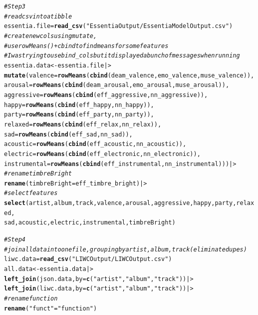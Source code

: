 \documentclass{article}\usepackage[]{graphicx}\usepackage[]{xcolor}
\makeatletter
\newcommand{\hlsng}[1]{\textcolor[rgb]{0.192,0.494,0.8}{#1}}%
\newcommand{\hlcom}[1]{\textcolor[rgb]{0.678,0.584,0.686}{\textit{#1}}}%
\newcommand{\hldef}[1]{\textcolor[rgb]{0.345,0.345,0.345}{#1}}%
\newcommand{\hlkwb}[1]{\textcolor[rgb]{0.69,0.353,0.396}{#1}}%
\newcommand{\hlkwc}[1]{\textcolor[rgb]{0.333,0.667,0.333}{#1}}%
\newcommand{\hlkwd}[1]{\textcolor[rgb]{0.737,0.353,0.396}{\textbf{#1}}}%
\newenvironment{kframe}{%
 \def\at@end@of@kframe{}%
 \ifinner\ifhmode%
  \def\at@end@of@kframe{\end{minipage}}%
  \begin{minipage}{\columnwidth}%
 \fi\fi%
 \def\FrameCommand##1{\hskip\@totalleftmargin \hskip-\fboxsep
 \colorbox{shadecolor}{##1}\hskip-\fboxsep
     \hskip-\linewidth \hskip-\@totalleftmargin \hskip\columnwidth}%
 \MakeFramed {\advance\hsize-\width
   \@totalleftmargin\z@ \linewidth\hsize
   \@setminipage}}%
 {\par\unskip\endMakeFramed%
 \at@end@of@kframe}
\newenvironment{knitrout}{}{} %
\makeatother
\begin{document}
\begin{enumerate}
\begin{knitrout}
\begin{kframe}
\begin{alltt}
\hlcom{# Step 3}
\hlcom{# read csv into a tibble}
\hldef{essentia.file} \hlkwb{=} \hlkwd{read_csv}\hldef{(}\hlsng{"EssentiaOutput/EssentiaModelOutput.csv"}\hldef{)}
\hlcom{# create new cols using mutate, }
\hlcom{# use rowMeans() + cbind to find means for some features}
\hlcom{# I was trying to use bind_cols but it displayed a bunch of messages when running}
\hldef{essentia.data} \hlkwb{<-} \hldef{essentia.file |>}
  \hlkwd{mutate}\hldef{(}\hlkwc{valence} \hldef{=} \hlkwd{rowMeans}\hldef{(}\hlkwd{cbind}\hldef{(deam_valence, emo_valence, muse_valence)),}
         \hlkwc{arousal} \hldef{=} \hlkwd{rowMeans}\hldef{(}\hlkwd{cbind}\hldef{(deam_arousal, emo_arousal, muse_arousal)),}
         \hlkwc{aggressive} \hldef{=} \hlkwd{rowMeans}\hldef{(}\hlkwd{cbind}\hldef{(eff_aggressive, nn_aggressive)),}
         \hlkwc{happy} \hldef{=} \hlkwd{rowMeans}\hldef{(}\hlkwd{cbind}\hldef{(eff_happy, nn_happy)),}
         \hlkwc{party} \hldef{=} \hlkwd{rowMeans}\hldef{(}\hlkwd{cbind}\hldef{(eff_party, nn_party)),}
         \hlkwc{relaxed} \hldef{=} \hlkwd{rowMeans}\hldef{(}\hlkwd{cbind}\hldef{(eff_relax, nn_relax)),}
         \hlkwc{sad} \hldef{=} \hlkwd{rowMeans}\hldef{(}\hlkwd{cbind}\hldef{(eff_sad, nn_sad)),}
         \hlkwc{acoustic} \hldef{=} \hlkwd{rowMeans}\hldef{(}\hlkwd{cbind}\hldef{(eff_acoustic, nn_acoustic)),}
         \hlkwc{electric} \hldef{=} \hlkwd{rowMeans}\hldef{(}\hlkwd{cbind}\hldef{(eff_electronic, nn_electronic)),}
         \hlkwc{instrumental} \hldef{=} \hlkwd{rowMeans}\hldef{(}\hlkwd{cbind}\hldef{(eff_instrumental, nn_instrumental))) |>}
\hlcom{# rename timbreBright}
  \hlkwd{rename}\hldef{(}\hlkwc{timbreBright} \hldef{= eff_timbre_bright) |>}
\hlcom{# select features}
  \hlkwd{select}\hldef{(artist, album, track, valence, arousal, aggressive, happy, party, relaxed,}
         \hldef{sad, acoustic, electric, instrumental, timbreBright)}


\hlcom{# Step 4}
\hlcom{# join all data into one file, grouping by artist, album, track (eliminate dupes)}
\hldef{liwc.data} \hlkwb{=} \hlkwd{read_csv}\hldef{(}\hlsng{"LIWCOutput/LIWCOutput.csv"}\hldef{)}
\hldef{all.data} \hlkwb{<-} \hldef{essentia.data |>}
  \hlkwd{left_join}\hldef{(json.data,} \hlkwc{by} \hldef{=} \hlkwd{c}\hldef{(}\hlsng{"artist"}\hldef{,} \hlsng{"album"}\hldef{,} \hlsng{"track"}\hldef{)) |>}
  \hlkwd{left_join}\hldef{(liwc.data,} \hlkwc{by} \hldef{=} \hlkwd{c}\hldef{(}\hlsng{"artist"}\hldef{,} \hlsng{"album"}\hldef{,} \hlsng{"track"}\hldef{)) |>}
\hlcom{# rename function}
  \hlkwd{rename}\hldef{(}\hlsng{"funct"} \hldef{=} \hlsng{"function"}\hldef{)}



\end{alltt}
\end{kframe}
\end{knitrout}
\end{enumerate}
\end{document}
